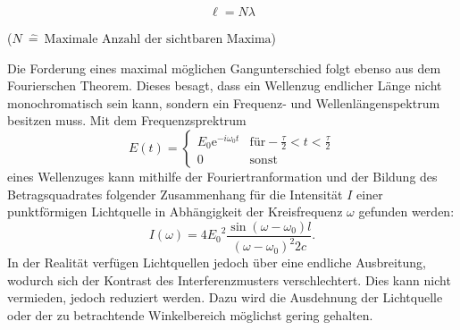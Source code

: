 \begin{equation}
  \ell = N\lambda
\end{equation}
\begin{center}
 \small {($ N \: \hat{=} \:\text{Maximale Anzahl der sichtbaren Maxima}$)}
\end{center}
Die Forderung eines maximal möglichen Gangunterschied folgt ebenso aus dem Fourierschen Theorem. Dieses besagt, dass
ein Wellenzug endlicher Länge nicht monochromatisch sein kann, sondern ein Frequenz- und Wellenlängenspektrum besitzen muss.
Mit dem Frequenzsprektrum
\begin{equation}
  E(t)=\begin{cases}
  E_0\mathrm{e}^{-i\omega_0t} & \text{für} -\frac{\tau}{2}<t<\frac{\tau}{2}\\
  0 & \text{sonst}
  \end{cases}
\end{equation}
eines Wellenzuges kann mithilfe der Fouriertranformation und der Bildung des Betragsquadrates folgender Zusammenhang für die Intensität $I$ einer punktförmigen
Lichtquelle in Abhängigkeit der Kreisfrequenz $\omega$ gefunden werden:
\begin{equation}
  I(\omega)= 4 {E_0}^2 \frac{\sin(\omega-\omega_0)l}{(\omega-\omega_0)^2 2c} \text{.}
\end{equation}
In der Realität verfügen Lichtquellen jedoch über eine endliche Ausbreitung, wodurch sich der Kontrast des Interferenzmusters verschlechtert.
Dies kann nicht vermieden, jedoch reduziert werden. Dazu wird die Ausdehnung der Lichtquelle oder der zu betrachtende Winkelbereich möglichst gering gehalten.

